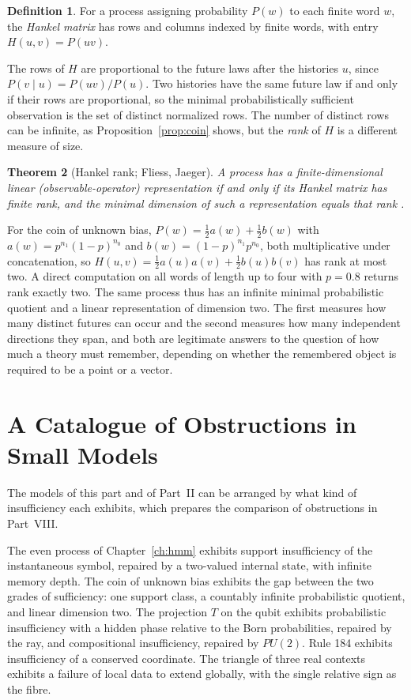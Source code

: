 \documentclass[11pt,oneside]{book}
\newtheorem{theorem}{Theorem}[chapter]
\theoremstyle{definition}
\newtheorem{definition}[theorem]{Definition}
\theoremstyle{remark}
\begin{document}
\begin{definition}
For a process assigning probability $P(w)$ to each finite word $w$, the \emph{Hankel matrix} has rows and columns indexed by finite words, with entry $H(u,v)=P(uv)$.
\end{definition}

The rows of $H$ are proportional to the future laws after the histories $u$, since $P(v\mid u)=P(uv)/P(u)$. Two histories have the same future law if and only if their rows are proportional, so the minimal probabilistically sufficient observation is the set of distinct normalized rows. The number of distinct rows can be infinite, as Proposition~\ref{prop:coin} shows, but the \emph{rank} of $H$ is a different measure of size.

\begin{theorem}[Hankel rank; Fliess, Jaeger]\label{thm:hankel}
A process has a finite-dimensional linear (observable-operator) representation if and only if its Hankel matrix has finite rank, and the minimal dimension of such a representation equals that rank \cite{fliess1974,jaeger2000}.
\end{theorem}

For the coin of unknown bias, $P(w)=\tfrac12a(w)+\tfrac12b(w)$ with $a(w)=p^{n_1}(1-p)^{n_0}$ and $b(w)=(1-p)^{n_1}p^{n_0}$, both multiplicative under concatenation, so $H(u,v)=\tfrac12a(u)a(v)+\tfrac12b(u)b(v)$ has rank at most two. A direct computation on all words of length up to four with $p=0.8$ returns rank exactly two. The same process thus has an infinite minimal probabilistic quotient and a linear representation of dimension two. The first measures how many distinct futures can occur and the second measures how many independent directions they span, and both are legitimate answers to the question of how much a theory must remember, depending on whether the remembered object is required to be a point or a vector.

\chapter{A Catalogue of Obstructions in Small Models}\label{ch:catalogue}

The models of this part and of Part~II can be arranged by what kind of insufficiency each exhibits, which prepares the comparison of obstructions in Part~VIII.

The even process of Chapter~\ref{ch:hmm} exhibits support insufficiency of the instantaneous symbol, repaired by a two-valued internal state, with infinite memory depth. The coin of unknown bias exhibits the gap between the two grades of sufficiency: one support class, a countably infinite probabilistic quotient, and linear dimension two. The projection $T$ on the qubit exhibits probabilistic insufficiency with a hidden phase relative to the Born probabilities, repaired by the ray, and compositional insufficiency, repaired by $PU(2)$. Rule 184 exhibits insufficiency of a conserved coordinate. The triangle of three real contexts exhibits a failure of local data to extend globally, with the single relative sign as the fibre.
\end{document}
